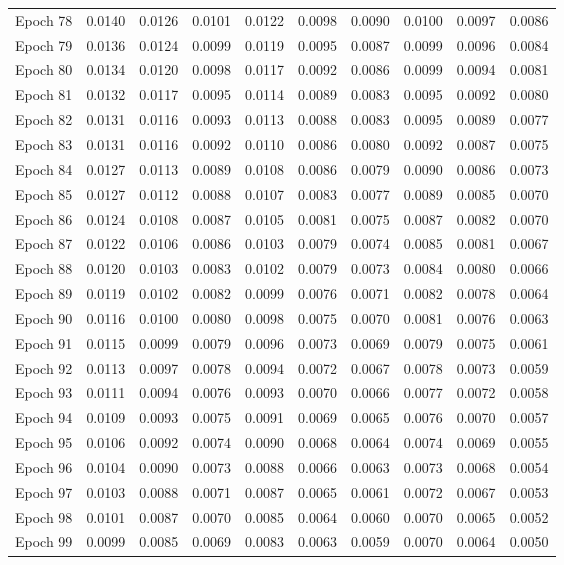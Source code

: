 \begin{table}[htbp]
\begin{tabular}{|l|l|l|l|l|l|l|l|l|l|}
Epoch 78 & 0.0140 & 0.0126 & 0.0101 & 0.0122 & 0.0098 & 0.0090 & 0.0100 & 0.0097 & 0.0086  \\
Epoch 79 & 0.0136 & 0.0124 & 0.0099 & 0.0119 & 0.0095 & 0.0087 & 0.0099 & 0.0096 & 0.0084  \\
Epoch 80 & 0.0134 & 0.0120 & 0.0098 & 0.0117 & 0.0092 & 0.0086 & 0.0099 & 0.0094 & 0.0081  \\
Epoch 81 & 0.0132 & 0.0117 & 0.0095 & 0.0114 & 0.0089 & 0.0083 & 0.0095 & 0.0092 & 0.0080  \\
Epoch 82 & 0.0131 & 0.0116 & 0.0093 & 0.0113 & 0.0088 & 0.0083 & 0.0095 & 0.0089 & 0.0077  \\
Epoch 83 & 0.0131 & 0.0116 & 0.0092 & 0.0110 & 0.0086 & 0.0080 & 0.0092 & 0.0087 & 0.0075  \\
Epoch 84 & 0.0127 & 0.0113 & 0.0089 & 0.0108 & 0.0086 & 0.0079 & 0.0090 & 0.0086 & 0.0073  \\
Epoch 85 & 0.0127 & 0.0112 & 0.0088 & 0.0107 & 0.0083 & 0.0077 & 0.0089 & 0.0085 & 0.0070  \\
Epoch 86 & 0.0124 & 0.0108 & 0.0087 & 0.0105 & 0.0081 & 0.0075 & 0.0087 & 0.0082 & 0.0070  \\
Epoch 87 & 0.0122 & 0.0106 & 0.0086 & 0.0103 & 0.0079 & 0.0074 & 0.0085 & 0.0081 & 0.0067  \\
Epoch 88 & 0.0120 & 0.0103 & 0.0083 & 0.0102 & 0.0079 & 0.0073 & 0.0084 & 0.0080 & 0.0066  \\
Epoch 89 & 0.0119 & 0.0102 & 0.0082 & 0.0099 & 0.0076 & 0.0071 & 0.0082 & 0.0078 & 0.0064  \\
Epoch 90 & 0.0116 & 0.0100 & 0.0080 & 0.0098 & 0.0075 & 0.0070 & 0.0081 & 0.0076 & 0.0063  \\
Epoch 91 & 0.0115 & 0.0099 & 0.0079 & 0.0096 & 0.0073 & 0.0069 & 0.0079 & 0.0075 & 0.0061  \\
Epoch 92 & 0.0113 & 0.0097 & 0.0078 & 0.0094 & 0.0072 & 0.0067 & 0.0078 & 0.0073 & 0.0059  \\
Epoch 93 & 0.0111 & 0.0094 & 0.0076 & 0.0093 & 0.0070 & 0.0066 & 0.0077 & 0.0072 & 0.0058  \\
Epoch 94 & 0.0109 & 0.0093 & 0.0075 & 0.0091 & 0.0069 & 0.0065 & 0.0076 & 0.0070 & 0.0057  \\
Epoch 95 & 0.0106 & 0.0092 & 0.0074 & 0.0090 & 0.0068 & 0.0064 & 0.0074 & 0.0069 & 0.0055  \\
Epoch 96 & 0.0104 & 0.0090 & 0.0073 & 0.0088 & 0.0066 & 0.0063 & 0.0073 & 0.0068 & 0.0054  \\
Epoch 97 & 0.0103 & 0.0088 & 0.0071 & 0.0087 & 0.0065 & 0.0061 & 0.0072 & 0.0067 & 0.0053  \\
Epoch 98 & 0.0101 & 0.0087 & 0.0070 & 0.0085 & 0.0064 & 0.0060 & 0.0070 & 0.0065 & 0.0052  \\
Epoch 99 & 0.0099 & 0.0085 & 0.0069 & 0.0083 & 0.0063 & 0.0059 & 0.0070 & 0.0064 & 0.0050  \\
\hline
\end{tabular}
\end{table}